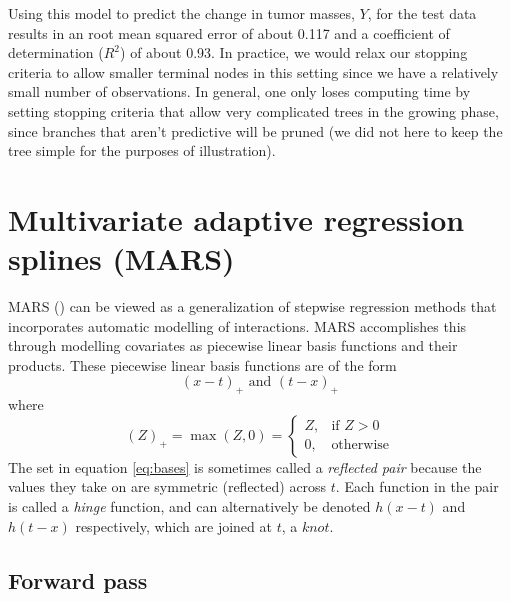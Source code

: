 \documentclass[12pt]{article}
\begin{document}
Using this model to predict the change in tumor masses, $Y$, for the test data results in an root mean squared error of about 0.117 and a coefficient of determination ($R^2$) of about 0.93. In practice, we would relax our stopping criteria to allow smaller terminal nodes in this setting since we have a relatively small number of observations. In general, one only loses computing time by setting stopping criteria that allow very complicated trees in the growing phase, since branches that aren't predictive will be pruned (we did not here to keep the tree simple for the purposes of illustration).




\section{Multivariate adaptive regression splines (MARS)} %
\label{sec:mars}

MARS (\cite{mars}) can be viewed as a generalization of stepwise regression methods that incorporates automatic modelling of interactions. MARS accomplishes this through modelling covariates as piecewise linear basis functions and their products. These piecewise linear basis functions are of the form 
%
\begin{equation} \label{eq:bases}
  (x - t)_{+} \text{ and } (t - x)_{+}
\end{equation} where
%
\begin{equation}
  (Z)_{+} = \max(Z, 0) = \begin{cases}
  Z, & \text{if } Z > 0 \\
  0, & \text{otherwise}
  \end{cases}
\end{equation}
The set in equation \ref{eq:bases} is sometimes called a \emph{reflected pair} because the values they take on are symmetric (reflected) across $t$. Each function in the pair is called a \emph{hinge} function, and can alternatively be denoted $h(x - t)$ and $h(t - x)$ respectively, which are joined at $t$, a $knot$.

\subsection{Forward pass} %
\label{sub:forward_pass}
\end{document}
